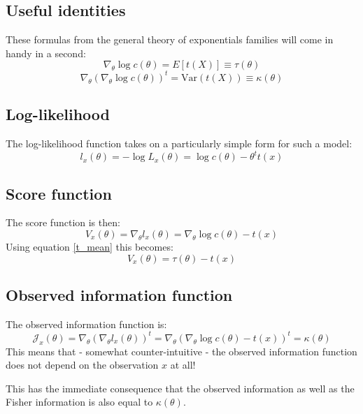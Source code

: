 \documentclass[12pt, a4paper]{article}
\numberwithin{equation}{section}
\begin{document}
\subsection{Useful identities}
These formulas from the general theory of exponentials families will come in handy in a second:
\begin{equation}
\label{t_mean}
\nabla_\theta\log c(\theta)=E[t(X)]\equiv\tau(\theta)
\end{equation}
\begin{equation}
\label{t_variance}
\nabla_\theta(\nabla_\theta \log c(\theta))^t=\textrm{Var}(t(X))\equiv\kappa(\theta)
\end{equation}

\subsection{Log-likelihood}
The log-likelihood function takes on a particularly simple form for such a model:
\begin{equation}
l_x(\theta)=-\log L_x(\theta)=\log c(\theta)-\theta^t t(x)
\end{equation}

\subsection{Score function}
The score function is then:
\begin{equation}
V_x(\theta)=\nabla_\theta l_x(\theta)=\nabla_\theta\log c(\theta)-t(x)
\end{equation}
Using equation \ref{t_mean} this becomes:
\begin{equation}
V_x(\theta)=\tau(\theta)-t(x)
\end{equation}

\subsection{Observed information function}
The observed information function is:
\begin{equation}
\mathcal{J}_x(\theta)=\nabla_\theta(\nabla_\theta l_x(\theta))^t=\nabla_\theta(\nabla_\theta \log c(\theta)-t(x))^t=\kappa(\theta)
\end{equation}
This means that - somewhat counter-intuitive - the observed information function does not depend on the observation $x$ at all!

This has the immediate consequence that the observed information as well as the Fisher information is also equal to $\kappa(\theta)$. 
\end{document}
